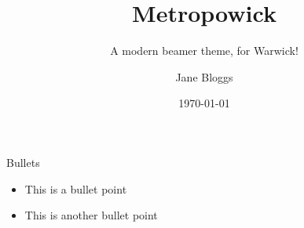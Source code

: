 \documentclass[10pt,aspectratio=169]{beamer}
\title{Metropowick}\subtitle{A modern beamer theme, for Warwick!}
\date{\today}
\author{Jane Bloggs}
\institute{University of Warwick}
\begin{document}
\maketitle

\begin{frame}{Bullets}
    \begin{itemize}
        \item This is a bullet point
        \item This is another bullet point
    \end{itemize}
\end{frame}
\end{document}
